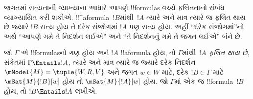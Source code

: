 \documentclass[../../../include/open-logic-section]{subfiles}
\begin{document}


\begin{explain}
  જગતમાં સત્યતાની વ્યાખ્યાના આધારે આપણે
  !!{formula}s વચ્ચે ફલિતતાનો સંબંધ વ્યાખ્યાયિત કરી
  શકીએ. !!^a{formula}~$!B$માંથી~$!A$ ત્યારે અને માત્ર
  ત્યારે જ ફલિત થાય છે જ્યારે $!B$ સત્ય હોય તે દરેક
  સંજોગમાં $!A$ પણ સત્ય હોય. અહીં ``દરેક સંજોગમાં''નો
  અર્થ ``આપણે ગમે તે નિદર્શન લઈએ'' અને ``તે
  નિદર્શનનું ગમે તે જગત લઈએ'' બંને છે.
\end{explain}

\begin{defn}
  જો $\Gamma$ એ !!{formula}sનો ગણ હોય અને $!A$
  !!a{formula} હોય, તો $\Gamma$માંથી~$!A$
  \emph{ફલિત થાય છે}, સંકેતમાં $\Gamma \Entails !A$,
  ત્યારે અને માત્ર ત્યારે જ જ્યારે દરેક નિદર્શન
  $\mModel{M} = \tuple{W, R, V}$ અને જગત $w \in W$
  માટે, દરેક $!B \in \Gamma$ માટે $\mSat{M}{!B}[w]$
  હોય તો $\mSat{M}{!A}[w]$ હોય. જો $\Gamma$માં એક જ
  !!{formula}~$!B$ હોય, તો $!B \Entails !A$ લખીએ.
\end{defn}
\end{document}

